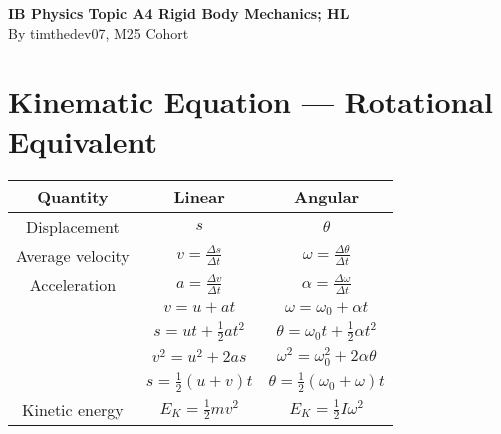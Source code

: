 \documentclass[a4paper,12pt]{article}
\let\oldsection\section
\renewcommand\section{\clearpage\oldsection}
\begin{document}
\pagestyle{fancy}


\begin{titlepage}
  \begin{center}

    \vspace*{8cm}
    \textbf{\Large {IB Physics Topic A4 Rigid Body Mechanics; HL}} \\
    \vspace*{1cm}
    \large{By timthedev07, M25 Cohort}

  \end{center}
\end{titlepage}

\pagebreak
\tableofcontents
\pagebreak

\clearpage
\setcounter{page}{1}

\section{Kinematic Equation --- Rotational Equivalent}

\begin{table}[H]
  \centering
  \begin{tabular}{|c|c|c|}
    \hline
    Quantity         & Linear                          & Angular                                       \\
    \hline
    Displacement     & $s$                             & $\theta$                                      \\
    \hline
    Average velocity & $v = \frac{\Delta s}{\Delta t}$ & $\omega = \frac{\Delta\theta}{\Delta t}$      \\
    \hline
    Acceleration     & $a = \frac{\Delta v}{\Delta t}$ & $\alpha = \frac{\Delta\omega}{\Delta t}$      \\
    \hline
                     & $v = u + at$                    & $\omega = \omega_0 + \alpha t$                \\
    \hline
                     & $s = ut + \frac{1}{2}at^2$      & $\theta = \omega_0 t + \frac{1}{2}\alpha t^2$ \\
    \hline
                     & $v^2 = u^2 + 2as$               & $\omega^2 = \omega_0^2 + 2\alpha\theta$       \\
    \hline
                     & $s = \frac{1}{2}(u + v)t$       & $\theta = \frac{1}{2}(\omega_0 + \omega)t$    \\
    \hline
    Kinetic energy   & $E_K = \frac{1}{2}mv^2$         & $E_K = \frac{1}{2}I\omega^2$                  \\
    \hline
  \end{tabular}
\end{table}
\end{document}
